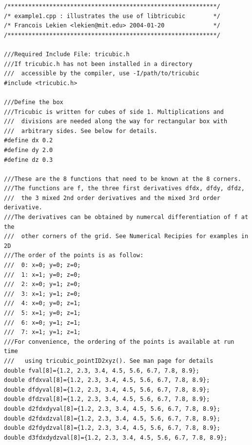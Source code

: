 \documentclass{article}
\begin{document}
\begin{verbatim}
/************************************************************/
/* example1.cpp : illustrates the use of libtricubic        */
/* Francois Lekien <lekien@mit.edu> 2004-01-20              */
/************************************************************/

///Required Include File: tricubic.h
///If tricubic.h has not been installed in a directory
///  accessible by the compiler, use -I/path/to/tricubic
#include <tricubic.h>

///Define the box
///Tricubic is written for cubes of side 1. Multiplications and
///  divisions are needed along the way for rectangular box with
///  arbitrary sides. See below for details.
#define dx 0.2
#define dy 2.0
#define dz 0.3

///These are the 8 functions that need to be known at the 8 corners.
///The functions are f, the three first derivatives dfdx, dfdy, dfdz,
///  the 3 mixed 2nd order derivatives and the mixed 3rd order derivative.
///The derivatives can be obtained by numercal differentiation of f at the
///  other corners of the grid. See Numerical Recipies for examples in 2D
///The order of the points is as follow:
///  0: x=0; y=0; z=0;
///  1: x=1; y=0; z=0;
///  2: x=0; y=1; z=0;
///  3: x=1; y=1; z=0;
///  4: x=0; y=0; z=1;
///  5: x=1; y=0; z=1;
///  6: x=0; y=1; z=1;
///  7: x=1; y=1; z=1;
///For convenience, the ordering of the points is available at run time
///   using tricubic_pointID2xyz(). See man page for details
double fval[8]={1.2, 2.3, 3.4, 4.5, 5.6, 6.7, 7.8, 8.9};
double dfdxval[8]={1.2, 2.3, 3.4, 4.5, 5.6, 6.7, 7.8, 8.9};
double dfdyval[8]={1.2, 2.3, 3.4, 4.5, 5.6, 6.7, 7.8, 8.9};
double dfdzval[8]={1.2, 2.3, 3.4, 4.5, 5.6, 6.7, 7.8, 8.9};
double d2fdxdyval[8]={1.2, 2.3, 3.4, 4.5, 5.6, 6.7, 7.8, 8.9};
double d2fdxdzval[8]={1.2, 2.3, 3.4, 4.5, 5.6, 6.7, 7.8, 8.9};
double d2fdydzval[8]={1.2, 2.3, 3.4, 4.5, 5.6, 6.7, 7.8, 8.9};
double d3fdxdydzval[8]={1.2, 2.3, 3.4, 4.5, 5.6, 6.7, 7.8, 8.9};


\end{verbatim}
\end{document}
